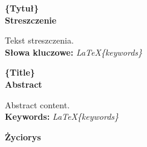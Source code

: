 \afterpage{\null\newpage}

\clearpage
{}
\newpage
\clearpage
{}
\begin{center}
	\fontsize{18pt}{12pt}\selectfont\textbf{\{Tytuł\}}\\
	\vspace{1cm}
	\fontsize{14pt}{12pt}\selectfont
	\textbf{Streszczenie}
\end{center}
Tekst streszczenia.\\
\noindent\textbf{Słowa kluczowe:} \textit{\LaTeX \{keywords\}}\\
\vspace{1.5cm}

\begin{center}
	\fontsize{18pt}{12pt}\selectfont\textbf{\{Title\}}\\
	\vspace{1cm}
	\fontsize{14pt}{12pt}\selectfont
	\textbf{Abstract}
\end{center}
Abstract content.\\
\noindent\textbf{Keywords:} \textit{\LaTeX \{keywords\}}\\
\vspace{1.5cm}

\newpage
\begin{center}
	\textbf{Życiorys}
\end{center}
\vspace{1cm}
\lipsum[4-5]
